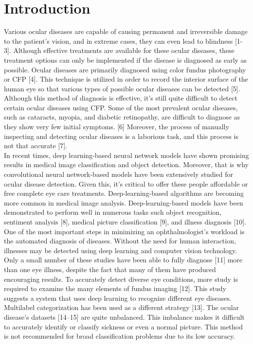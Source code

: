 
\chapter{Introduction}


Various ocular diseases are capable of causing permanent and irreversible damage to the patient’s vision, and in extreme cases, they can even lead to blindness [1-3]. Although effective treatments are available for these ocular diseases, these treatment options can only be implemented if the disease is diagnosed as early as possible. Ocular diseases are primarily diagnosed using color fundus photography or CFP [4]. This technique is utilized in order to record the interior surface of the human eye so that various types of possible ocular diseases can be detected [5]. Although this method of diagnosis is effective, it’s still quite difficult to detect certain ocular diseases using CFP. Some of the most prevalent ocular diseases, such as cataracts, myopia, and diabetic retinopathy, are difficult to diagnose as they show very few initial symptoms. [6] Moreover, the process of manually inspecting and detecting ocular diseases is a laborious task, and this process is not that accurate [7].\\ In recent times, deep learning-based neural network models have shown promising results in medical image classification and object detection. Moreover, that is why convolutional neural network-based models have been extensively studied for ocular disease detection. Given this, it’s critical to offer these people affordable or free complete eye care treatments. Deep-learning-based algorithms are becoming more common in medical image analysis. Deep-learning-based models have been demonstrated to perform well in numerous tasks such object recognition, sentiment analysis [8], medical picture classification [9], and illness diagnosis [10]. One of the most important steps in minimizing an ophthalmologist’s workload is the automated diagnosis of diseases. Without the need for human interaction, illnesses may be detected using deep learning and computer vision technology. Only a small number of these studies have been able to fully diagnose [11] more than one eye illness, despite the fact that many of them have produced encouraging results. To accurately detect diverse eye conditions, more study is required to examine the many elements of fundus imaging [12]. This study suggests a system that uses deep learning to recognize different eye diseases. Multilabel categorization has been used as a different strategy [13]. The ocular disease’s datasets [14–15] are quite unbalanced. This imbalance makes it difficult to accurately identify or classify sickness or even a normal picture. This method is not recommended for broad classification problems due to its low accuracy.\\
